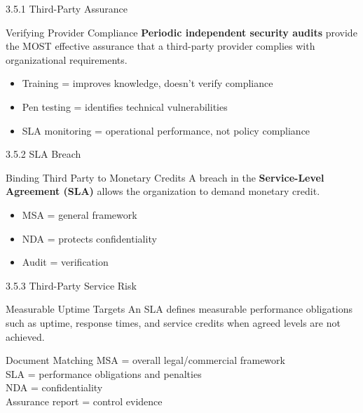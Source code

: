 \documentclass{beamer}
\begin{document}
	\begin{frame}{3.5.1 Third-Party Assurance}
		\begin{block}{Verifying Provider Compliance}
			\textbf{Periodic independent security audits} provide the MOST effective assurance that a third-party provider complies with organizational requirements.
		\end{block}
		\begin{itemize}
			\item Training = improves knowledge, doesn't verify compliance
			\item Pen testing = identifies technical vulnerabilities
			\item SLA monitoring = operational performance, not policy compliance
		\end{itemize}
	\end{frame}
	
	\begin{frame}{3.5.2 SLA Breach}
		\begin{block}{Binding Third Party to Monetary Credits}
			A breach in the \textbf{Service-Level Agreement (SLA)} allows the organization to demand monetary credit.
		\end{block}
		\begin{itemize}
			\item MSA = general framework
			\item NDA = protects confidentiality
			\item Audit = verification
		\end{itemize}
	\end{frame}
	
	\begin{frame}{3.5.3 Third-Party Service Risk}
		\begin{block}{Measurable Uptime Targets}
			An SLA defines measurable performance obligations such as uptime, response times, and service credits when agreed levels are not achieved.
		\end{block}
		\begin{exampleblock}{Document Matching}
			MSA = overall legal/commercial framework \\
			SLA = performance obligations and penalties \\
			NDA = confidentiality \\
			Assurance report = control evidence
		\end{exampleblock}
	\end{frame}
	
\end{document}
